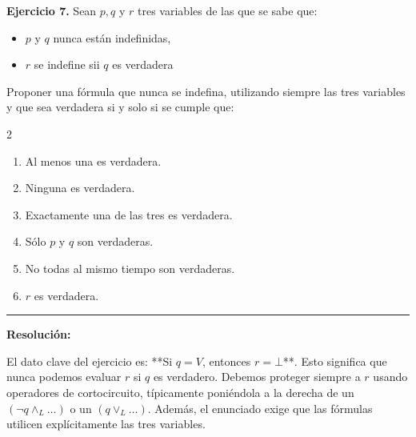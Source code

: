 \hypertarget{ej7}{}
\noindent \textbf{Ejercicio 7.} Sean $p, q$ y $r$ tres variables de las que se sabe que:
\begin{itemize}
    \item $p$ y $q$ nunca están indefinidas,
    \item $r$ se indefine sii $q$ es verdadera
\end{itemize}
Proponer una fórmula que nunca se indefina, utilizando siempre las tres variables y que sea verdadera si y solo si se cumple que:

\begin{multicols}{2}
\begin{enumerate}[label=\alph*)]
    \item Al menos una es verdadera.
    \item Ninguna es verdadera.
    \item Exactamente una de las tres es verdadera.
    \item Sólo $p$ y $q$ son verdaderas.
    \item No todas al mismo tiempo son verdaderas.
    \item $r$ es verdadera.
\end{enumerate}
\end{multicols}

\vspace{0.2cm}
{\color{gray}\hrule}
\vspace{0.4cm}

\textbf{Resolución:}

El dato clave del ejercicio es: **Si $q=V$, entonces $r=\bot$**. 
Esto significa que nunca podemos evaluar $r$ si $q$ es verdadero. Debemos proteger siempre a $r$ usando operadores de cortocircuito, típicamente poniéndola a la derecha de un $(\neg q \wedge_L \dots)$ o un $(q \vee_L \dots)$. Además, el enunciado exige que las fórmulas utilicen explícitamente las tres variables.

